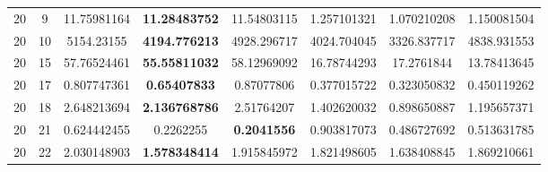 \documentclass[runningheads]{llncs}
\begin{document}
\begin{table}[h]
{\begin{tabular}{|c|c||c|c|c||c|c|c|}
    20 & 9 & 11.75981164 & \textbf{11.28483752} & 11.54803115 & 1.257101321 & 1.070210208 & 1.150081504 \\
    20 & 10 & 5154.23155 & \textbf{4194.776213} & 4928.296717 & 4024.704045 & 3326.837717 & 4838.931553 \\
    20 & 15 & 57.76524461 & \textbf{55.55811032} & 58.12969092 & 16.78744293 & 17.2761844 & 13.78413645 \\
    20 & 17 & 0.807747361 & \textbf{0.65407833} & 0.87077806 & 0.377015722 & 0.323050832 & 0.450119262 \\
    20 & 18 & 2.648213694 & \textbf{2.136768786} & 2.51764207 & 1.402620032 & 0.898650887 & 1.195657371 \\
    20 & 21 & 0.624442455 & 0.2262255 & \textbf{0.2041556} & 0.903817073 & 0.486727692 & 0.513631785 \\
    20 & 22 & 2.030148903 & \textbf{1.578348414} & 1.915845972 & 1.821498605 & 1.638408845 & 1.869210661\\
    \hline
    \end{tabular}}
    \label{tab:my_label}
\end{table}
\hfill\break
\end{document}
